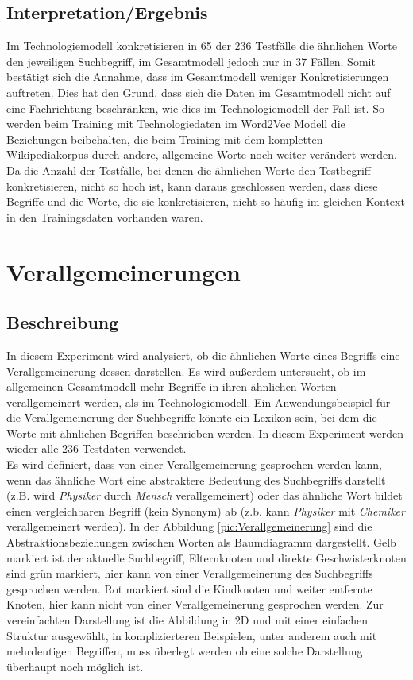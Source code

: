 \documentclass[12pt,a4paper]{report}
\begin{document}
		
		\subsection*{Interpretation/Ergebnis}
Im Technologiemodell konkretisieren in 65 der 236 Testfälle	die ähnlichen Worte den jeweiligen Suchbegriff, im Gesamtmodell jedoch nur in 37 Fällen. Somit bestätigt sich die Annahme, dass im Gesamtmodell weniger Konkretisierungen auftreten. Dies hat den Grund, dass sich die Daten im Gesamtmodell nicht auf eine Fachrichtung beschränken, wie dies im Technologiemodell der Fall ist. So werden beim Training mit Technologiedaten im Word2Vec Modell die Beziehungen beibehalten, die beim Training mit dem kompletten Wikipediakorpus durch andere, allgemeine Worte noch weiter verändert werden. \\
Da die Anzahl der Testfälle, bei denen die ähnlichen Worte den Testbegriff konkretisieren, nicht so hoch ist, kann daraus geschlossen werden, dass diese Begriffe und die Worte, die sie konkretisieren, nicht so häufig im gleichen Kontext in den Trainingsdaten vorhanden waren.\\
		
		
	
	\section{Verallgemeinerungen}
		\subsection*{Beschreibung}
		In diesem Experiment wird analysiert, ob die ähnlichen Worte eines Begriffs eine Verallgemeinerung dessen darstellen. Es wird außerdem untersucht, ob im allgemeinen Gesamtmodell mehr Begriffe in ihren ähnlichen Worten verallgemeinert werden, als im Technologiemodell. Ein Anwendungsbeispiel für die Verallgemeinerung der Suchbegriffe könnte ein Lexikon sein, bei dem die Worte mit ähnlichen Begriffen beschrieben werden. In diesem Experiment werden wieder alle 236 Testdaten verwendet.\\
		Es wird definiert, dass von einer Verallgemeinerung gesprochen werden kann, wenn das ähnliche Wort eine abstraktere Bedeutung des Suchbegriffs darstellt (z.B. wird \textit{Physiker} durch \textit{Mensch} verallgemeinert) oder das ähnliche Wort bildet einen vergleichbaren Begriff (kein Synonym) ab (z.b. kann \textit{Physiker} mit \textit{Chemiker} verallgemeinert werden). In der Abbildung \ref{pic:Verallgemeinerung} sind die Abstraktionsbeziehungen zwischen Worten als Baumdiagramm dargestellt. Gelb markiert ist der aktuelle Suchbegriff, Elternknoten und direkte Geschwisterknoten sind grün markiert, hier kann von einer Verallgemeinerung des Suchbegriffs gesprochen werden. Rot markiert sind die Kindknoten und weiter entfernte Knoten, hier kann nicht von einer Verallgemeinerung gesprochen werden. Zur vereinfachten Darstellung ist die Abbildung in 2D und mit einer einfachen Struktur ausgewählt, in komplizierteren Beispielen, unter anderem auch mit mehrdeutigen Begriffen, muss überlegt werden ob eine solche Darstellung überhaupt noch möglich ist.\\
		
\end{document}
